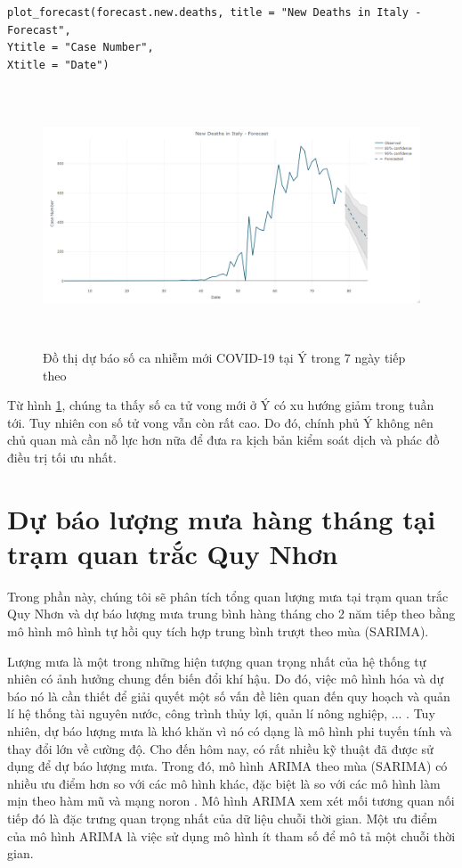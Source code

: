 \documentclass[12pt, a4paper,oneside]{book}
\theoremstyle{definition}
\begin{document}
\begin{lstlisting}
plot_forecast(forecast.new.deaths, title = "New Deaths in Italy - Forecast",
Ytitle = "Case Number",
Xtitle = "Date")
\end{lstlisting}
\begin{figure}[!htb]
	\centering
	\includegraphics[width=1\linewidth,height=7.7cm]{anh/A8}
	\vskip-4mm 
	\caption{Đồ thị dự báo số ca nhiễm mới COVID-19 tại Ý trong 7 ngày tiếp theo}  
	\label{A8}
\end{figure}
Từ hình \ref{A8}, chúng ta thấy số ca tử vong mới ở Ý có xu hướng giảm trong tuần tới. Tuy nhiên con số tử vong vẫn còn rất cao. Do đó, chính phủ Ý không nên chủ quan mà cần nỗ lực hơn nữa để đưa ra kịch bản kiểm soát dịch và phác đồ điều trị tối ưu nhất.

\section{Dự báo lượng mưa hàng tháng tại trạm quan trắc Quy Nhơn}
Trong phần này, chúng tôi sẽ phân tích tổng quan lượng mưa tại trạm quan trắc Quy Nhơn và dự báo lượng mưa trung bình hàng tháng cho 2 năm tiếp theo bằng mô hình mô hình tự hồi quy tích hợp trung bình trượt theo mùa (SARIMA).

Lượng mưa là một trong những hiện tượng quan trọng nhất của hệ thống tự nhiên có ảnh hưởng chung đến biến đổi khí hậu. Do đó, việc mô hình hóa và dự báo nó là cần thiết để giải quyết một số vấn đề liên quan đến quy hoạch và quản lí hệ thống tài nguyên nước, công trình thủy lợi, quản lí nông nghiệp, ... . Tuy nhiên, dự báo lượng mưa là khó khăn vì nó có dạng là mô hình phi tuyến tính và thay đổi lớn về cường độ. Cho đến hôm nay, có rất nhiều kỹ thuật đã được sử dụng để dự báo lượng mưa. Trong đó, mô hình ARIMA theo mùa (SARIMA) có nhiều ưu điểm hơn so với các mô hình khác, đặc biệt là so với các mô hình làm mịn theo hàm mũ và mạng noron \cite{22}. Mô hình ARIMA xem xét mối tương quan nối tiếp đó là đặc trưng quan trọng nhất của dữ liệu chuỗi thời gian. Một ưu điểm của mô hình ARIMA là việc sử dụng mô hình ít tham số để mô tả một chuỗi thời gian.
\end{document}
